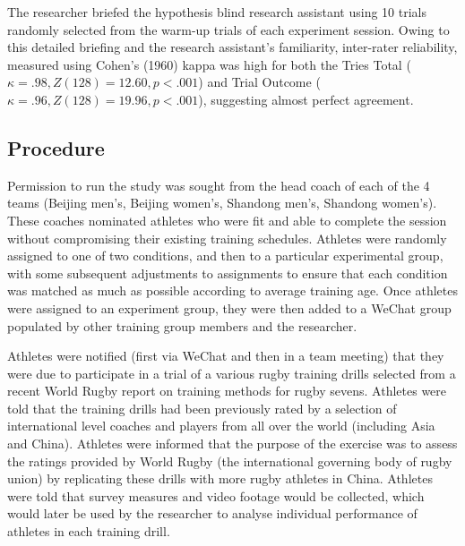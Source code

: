 \begin{CJK}{UTF8}{gbsn}

The researcher briefed the hypothesis blind research assistant using 10 trials randomly selected from the warm-up trials of each experiment session. Owing to this detailed briefing and the research assistant's familiarity, inter-rater reliability, measured using Cohen's (1960) kappa \citep[suitable for two coders, see][]{DiEugenio2004} was high for both the Tries Total ($\kappa = .98, Z(128) = 12.60, p < .001$) and Trial Outcome ($\kappa = .96, Z(128) = 19.96, p < .001$), suggesting almost perfect agreement.

\subsection{Procedure}
Permission to run the study was sought from the head coach of each of the 4 teams (Beijing men's, Beijing women's, Shandong men's, Shandong women's).  These coaches nominated athletes who were fit and able to complete the session without compromising their existing training schedules.  Athletes were randomly assigned to one of two conditions, and then to a particular experimental group, with some subsequent adjustments to assignments to ensure that each condition was matched as much as possible according to average training age.  Once athletes were assigned to an experiment group, they were then added to a WeChat group populated by other training group members and the researcher.

Athletes were notified (first via WeChat and then in a team meeting) that they were due to participate in a trial of a various rugby training drills selected from a recent World Rugby report on training methods for rugby sevens.  Athletes were told that the training drills had been previously rated by a selection of international level coaches and players from all over the world (including Asia and China).  Athletes were informed that the purpose of the exercise was to assess the ratings provided by World Rugby (the international governing body of rugby union) by replicating these drills with more rugby athletes in China.  Athletes were told that survey measures and video footage would be collected, which would later be used by the researcher to analyse individual performance of athletes in each training drill.



\end{CJK}
